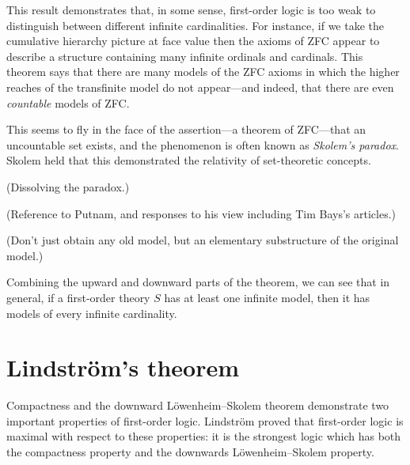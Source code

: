 \documentclass[10pt, a4paper, oneside]{article}
\theoremstyle{definition}
\theoremstyle{remark}
\theoremstyle{plain}
\begin{document}
This result demonstrates that, in some sense, first-order logic is too weak to
distinguish between different infinite cardinalities. For instance, if we take
the cumulative hierarchy picture at face value then the axioms of ZFC appear to
describe a structure containing many infinite ordinals and cardinals. This
theorem says that there are many models of the ZFC axioms in which the higher
reaches of the transfinite model do not appear---and indeed, that there are even
\emph{countable} models of ZFC.

This seems to fly in the face of the assertion---a theorem of ZFC---that an
uncountable set exists, and the phenomenon is often known as \emph{Skolem's
paradox}. Skolem held that this demonstrated the relativity of set-theoretic
concepts.

(Dissolving the paradox.)

(Reference to Putnam, and responses to his view including Tim Bays's articles.)

(Don't just obtain any old model, but an elementary substructure of the original
model.)

Combining the upward and downward parts of the theorem, we can see that in
general, if a first-order theory $S$ has at least one infinite model, then it
has models of every infinite cardinality.


\section{Lindström's theorem}

Compactness and the downward Löwenheim--Skolem theorem demonstrate two
important properties of first-order logic. Lindström proved that first-order
logic is maximal with respect to these properties: it is the strongest logic
which has both the compactness property and the downwards Löwenheim--Skolem
property.



\end{document}
